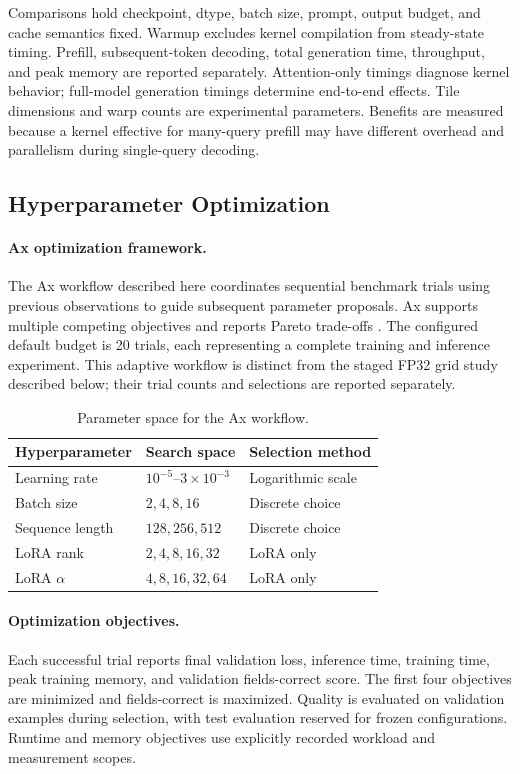 Comparisons hold checkpoint, dtype, batch size, prompt, output budget, and cache semantics fixed. Warmup excludes kernel compilation from steady-state timing. Prefill, subsequent-token decoding, total generation time, throughput, and peak memory are reported separately. Attention-only timings diagnose kernel behavior; full-model generation timings determine end-to-end effects. Tile dimensions and warp counts are experimental parameters. Benefits are measured because a kernel effective for many-query prefill may have different overhead and parallelism during single-query decoding.

\subsection{Hyperparameter Optimization}
\label{sec:method_hyperparameters}

\paragraph{Ax optimization framework.}
The Ax workflow described here coordinates sequential benchmark trials using previous observations to guide subsequent parameter proposals. Ax supports multiple competing objectives and reports Pareto trade-offs \cite{ax_moo}. The configured default budget is 20 trials, each representing a complete training and inference experiment. This adaptive workflow is distinct from the staged FP32 grid study described below; their trial counts and selections are reported separately.

\begin{table}[htbp]
\centering
\small
\begin{tabularx}{\textwidth}{@{}lXl@{}}
\toprule
Hyperparameter & Search space & Selection method\\
\midrule
Learning rate & $10^{-5}$--$3\times10^{-3}$ & Logarithmic scale\\
Batch size & $2,4,8,16$ & Discrete choice\\
Sequence length & $128,256,512$ & Discrete choice\\
LoRA rank & $2,4,8,16,32$ & LoRA only\\
LoRA $\alpha$ & $4,8,16,32,64$ & LoRA only\\
\bottomrule
\end{tabularx}
\caption{Parameter space for the Ax workflow.}
\label{tab:ax_space}
\end{table}

\paragraph{Optimization objectives.}
Each successful trial reports final validation loss, inference time, training time, peak training memory, and validation fields-correct score. The first four objectives are minimized and fields-correct is maximized. Quality is evaluated on validation examples during selection, with test evaluation reserved for frozen configurations. Runtime and memory objectives use explicitly recorded workload and measurement scopes.

